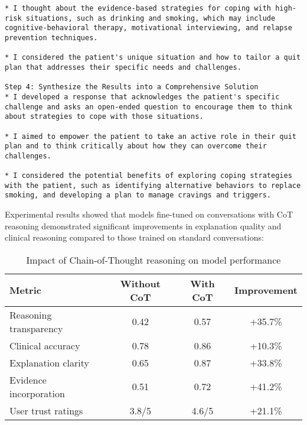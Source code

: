 \begin{mdframed}[linecolor=black, linewidth=1pt, backgroundcolor=gray!5, roundcorner=10pt, innerleftmargin=10pt, innerrightmargin=10pt]
{\begin{minipage}{\textwidth}
\begin{verbatim}
* I thought about the evidence-based strategies for coping with high-risk situations, such as drinking and smoking, which may include cognitive-behavioral therapy, motivational interviewing, and relapse prevention techniques.

* I considered the patient's unique situation and how to tailor a quit plan that addresses their specific needs and challenges.

Step 4: Synthesize the Results into a Comprehensive Solution
* I developed a response that acknowledges the patient's specific challenge and asks an open-ended question to encourage them to think about strategies to cope with those situations.

* I aimed to empower the patient to take an active role in their quit plan and to think critically about how they can overcome their challenges.

* I considered the potential benefits of exploring coping strategies with the patient, such as identifying alternative behaviors to replace smoking, and developing a plan to manage cravings and triggers.
\end{verbatim}
\end{minipage}
}
\end{mdframed}
Experimental results showed that models fine-tuned on conversations with CoT reasoning demonstrated significant improvements in explanation quality and clinical reasoning compared to those trained on standard conversations:

\begin{table}[h]
    \centering
    \setlength{\tabcolsep}{4pt}
    \renewcommand{\arraystretch}{1.3}
    \begin{tabular}{|l|c|c|c|}
        \hline
        \rowcolor{gray!15} \textbf{Metric} & \textbf{Without CoT} & \textbf{With CoT} & \textbf{Improvement} \\
        \hline
        Reasoning transparency & 0.42 & 0.57 & +35.7\% \\
        \hline
        Clinical accuracy & 0.78 & 0.86 & +10.3\% \\
        \hline
        Explanation clarity & 0.65 & 0.87 & +33.8\% \\
        \hline
        Evidence incorporation & 0.51 & 0.72 & +41.2\% \\
        \hline
        User trust ratings & 3.8/5 & 4.6/5 & +21.1\% \\
        \hline
    \end{tabular}
    \caption{Impact of Chain-of-Thought reasoning on model performance}
    \label{tab:cot_impact}
\end{table}


